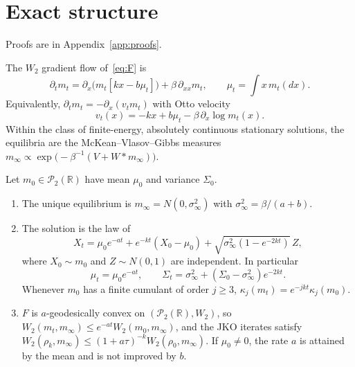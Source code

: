 \documentclass[anon,11pt]{alt2027}
\newcommand{\R}{\mathbb{R}}
\newcommand{\Ptwo}{\mathcal{P}_2}
\newcommand{\Wtwo}{W_2}
\begin{document}
\section{Exact structure}
\label{sec:structure}

Proofs are in Appendix~\ref{app:proofs}.

\begin{proposition}
\label{prop:gf}
The $W_2$ gradient flow of~\eqref{eq:F} is
\begin{equation}
\label{eq:mv}
\partial_t m_t
=
\partial_x\bigl(m_t[kx-b\mu_t]\bigr)
+
\beta\,\partial_{xx}m_t,
\qquad
\mu_t=\int x\,m_t(dx).
\end{equation}
Equivalently, $\partial_t m_t=-\partial_x(v_t m_t)$ with Otto velocity
\begin{equation}
\label{eq:velocity}
v_t(x)=-kx+b\mu_t-\beta\,\partial_x\log m_t(x).
\end{equation}
Within the class of finite-energy, absolutely continuous stationary
solutions, the equilibria are the McKean--Vlasov--Gibbs measures
$m_\infty\propto\exp\bigl(-\beta^{-1}(V+W\ast m_\infty)\bigr)$.
\end{proposition}

\begin{theorem}
\label{thm:gauss}
Let $m_0\in\Ptwo(\R)$ have mean $\mu_0$ and variance $\Sigma_0$.
\begin{enumerate}
\item[(i)] The unique equilibrium is $m_\infty=N(0,\sigma_\infty^2)$ with
$\sigma_\infty^2=\beta/(a+b)$.
\item[(ii)] The solution is the law of
\begin{equation}
\label{eq:affine}
X_t
=
\mu_0 e^{-at}
+
e^{-kt}(X_0-\mu_0)
+
\sqrt{\sigma_\infty^2(1-e^{-2kt})}\,Z,
\end{equation}
where $X_0\sim m_0$ and $Z\sim N(0,1)$ are independent. In particular
\begin{equation}
\label{eq:moments}
\mu_t=\mu_0 e^{-at},
\qquad
\Sigma_t
=
\sigma_\infty^2+(\Sigma_0-\sigma_\infty^2)e^{-2kt}.
\end{equation}
Whenever $m_0$ has a finite cumulant of order $j\ge 3$,
$\kappa_j(m_t)=e^{-jkt}\kappa_j(m_0)$.
\item[(iii)] $F$ is $a$-geodesically convex on $(\Ptwo(\R),\Wtwo)$, so
$\Wtwo(m_t,m_\infty)\le e^{-at}\Wtwo(m_0,m_\infty)$, and the JKO iterates satisfy
$\Wtwo(\rho_k,m_\infty)\le(1+a\tau)^{-k}\Wtwo(\rho_0,m_\infty)$.
If $\mu_0\neq 0$, the rate $a$ is attained by the mean and is not improved by
$b$.
\end{enumerate}
\end{theorem}
\end{document}
